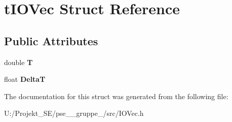 \hypertarget{structt_i_o_vec}{}\section{t\+I\+O\+Vec Struct Reference}
\label{structt_i_o_vec}
\subsection*{Public Attributes}
\begin{DoxyCompactItemize}
\item 
\mbox{\label{structt_i_o_vec_a574678096931ac20b336a639997965fc}} 
double {\bfseries T}
\item 
\mbox{\label{structt_i_o_vec_a3ac90cd1a8280f296d5cf56b26856eda}} 
float {\bfseries DeltaT}
\end{DoxyCompactItemize}


The documentation for this struct was generated from the following file\+:\begin{DoxyCompactItemize}
\item 
U\+:/\+Projekt\+\_\+\+S\+E/pse\+\_\+\_\+gruppe\+\_/src/I\+O\+Vec.\+h\end{DoxyCompactItemize}
